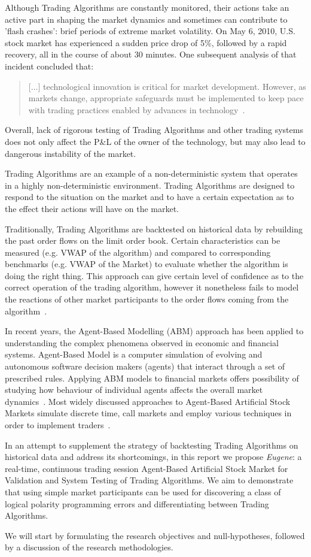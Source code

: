Although Trading Algorithms are constantly monitored, their actions take an active part in shaping the market dynamics and sometimes can contribute to 'flash crashes': brief periods of extreme market volatility. On May 6, 2010, U.S. stock market has experienced a sudden price drop of 5\%, followed by a rapid recovery, all in the course of about 30 minutes. One subsequent analysis of that incident concluded that:
\begin{quote}
[$\ldots$] technological innovation is critical for market development. However, as markets change, appropriate safeguards must be implemented to keep pace with trading practices enabled by advances in technology~\cite{Kirilenko2011}.
\end{quote}
Overall, lack of rigorous testing of Trading Algorithms and other trading systems does not only affect the P\&L  of the owner of the technology, but may also lead to dangerous instability of the market.

Trading Algorithms are an example of a non-deterministic system that operates in a highly non-deterministic environment. Trading Algorithms are designed to respond to the situation on the market and to have a certain expectation as to the effect their actions will have on the market.

Traditionally, Trading Algorithms are backtested on historical data by rebuilding the past order flows on the limit order book. Certain characteristics can be measured (e.g. VWAP of the algorithm) and compared to corresponding benchmarks (e.g. VWAP of the Market) to evaluate whether the algorithm is doing the right thing. This approach can give certain level of confidence as to the correct operation of the trading algorithm, however it nonetheless fails to model the reactions of other market participants to the order flows coming from the algorithm~\cite{Coggins2006}.

In recent years, the Agent-Based Modelling (ABM) approach has been applied to understanding the complex phenomena observed in economic and financial systems. Agent-Based Model is a computer simulation of evolving and autonomous software decision makers (agents) that interact through a set of prescribed rules. Applying ABM models to financial markets offers possibility of studying how behaviour of individual agents affects the overall market dynamics~\citep{Sorban2008, Farmer2009}. Most widely discussed approaches to Agent-Based Artificial Stock Markets simulate discrete time, call markets and employ various techniques in order to implement traders~\cite{Jha2010}.

In an attempt to supplement the strategy of backtesting Trading Algorithms on historical data and address its shortcomings, in this report we propose \emph{Eugene}: a real-time, continuous trading session Agent-Based Artificial Stock Market for Validation and System Testing of Trading Algorithms. We aim to demonstrate that using simple market participants can be used for discovering a class of logical polarity programming errors and differentiating between Trading Algorithms.

We will start by formulating the research objectives and null-hypotheses, followed by a discussion of the research methodologies.




